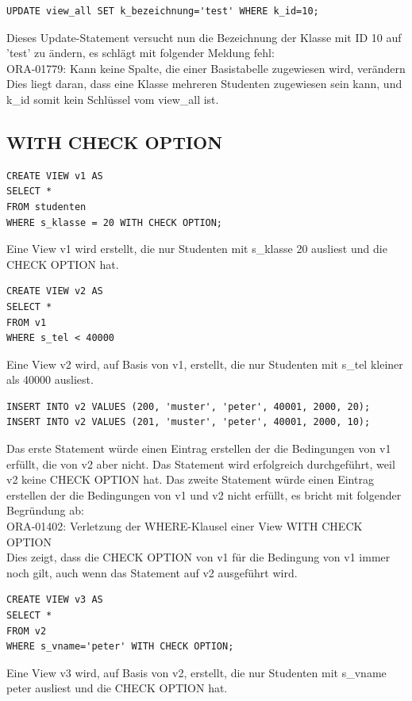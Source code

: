 \documentclass[10pt]{scrreprt}
\begin{document}
\begin{lstlisting}[style=sql]
UPDATE view_all SET k_bezeichnung='test' WHERE k_id=10;
\end{lstlisting}
Dieses Update-Statement versucht nun die Bezeichnung der Klasse mit ID 10 auf 'test' zu ändern, es schlägt mit folgender Meldung fehl:\\
ORA-01779: Kann keine Spalte, die einer Basistabelle zugewiesen wird, verändern\\
Dies liegt daran, dass eine Klasse mehreren Studenten zugewiesen sein kann, und k\_id somit kein Schlüssel vom view\_all ist.

\subsection{WITH CHECK OPTION}
\begin{lstlisting}[style=sql]
CREATE VIEW v1 AS
SELECT *
FROM studenten
WHERE s_klasse = 20 WITH CHECK OPTION;
\end{lstlisting}
Eine View v1 wird erstellt, die nur Studenten mit s\_klasse 20 ausliest und die CHECK OPTION hat.

\begin{lstlisting}[style=sql]
CREATE VIEW v2 AS
SELECT *
FROM v1
WHERE s_tel < 40000
\end{lstlisting}
Eine View v2 wird, auf Basis von v1, erstellt, die nur Studenten mit s\_tel kleiner als 40000 ausliest.

\begin{lstlisting}[style=sql]
INSERT INTO v2 VALUES (200, 'muster', 'peter', 40001, 2000, 20);
INSERT INTO v2 VALUES (201, 'muster', 'peter', 40001, 2000, 10);
\end{lstlisting}
Das erste Statement würde einen Eintrag erstellen der die Bedingungen von v1 erfüllt, die von v2 aber nicht. Das Statement wird erfolgreich durchgeführt, weil v2 keine CHECK OPTION hat.
Das zweite Statement würde einen Eintrag erstellen der die Bedingungen von v1 und v2 nicht erfüllt, es bricht mit folgender Begründung ab:\\
ORA-01402: Verletzung der WHERE-Klausel einer View WITH CHECK OPTION\\
Dies zeigt, dass die CHECK OPTION von v1 für die Bedingung von v1 immer noch gilt, auch wenn das Statement auf v2 ausgeführt wird.

\begin{lstlisting}[style=sql]
CREATE VIEW v3 AS
SELECT *
FROM v2
WHERE s_vname='peter' WITH CHECK OPTION;
\end{lstlisting}
Eine View v3 wird, auf Basis von v2, erstellt, die nur Studenten mit s\_vname peter ausliest und die CHECK OPTION hat.
\end{document}
